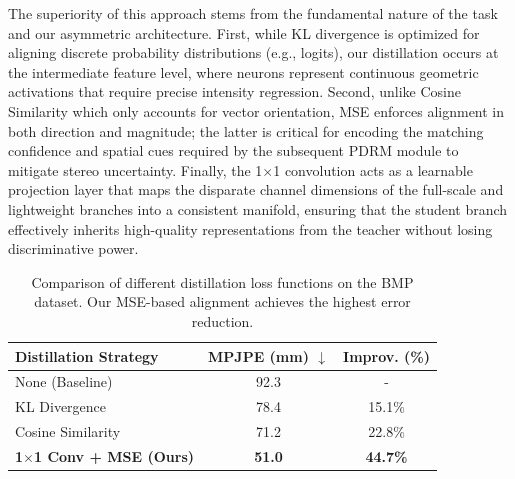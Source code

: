 \documentclass[journal]{IEEEtran}
\begin{document}
The superiority of this approach stems from the fundamental nature of the task and our asymmetric architecture. First, while KL divergence is optimized for aligning discrete probability distributions (e.g., logits), our distillation occurs at the intermediate feature level, where neurons represent continuous geometric activations that require precise intensity regression. Second, unlike Cosine Similarity which only accounts for vector orientation, MSE enforces alignment in both direction and magnitude; the latter is critical for encoding the matching confidence and spatial cues required by the subsequent PDRM module to mitigate stereo uncertainty. Finally, the 1$\times$1 convolution acts as a learnable projection layer that maps the disparate channel dimensions of the full-scale and lightweight branches into a consistent manifold, ensuring that the student branch effectively inherits high-quality representations from the teacher without losing discriminative power.

\begin{table}[htbp]
\centering
\caption{Comparison of different distillation loss functions on the BMP dataset. Our MSE-based alignment achieves the highest error reduction.}
\label{distillation_loss}
\renewcommand{\arraystretch}{1.1}
\small
\begin{tabular}{l|c|c}
\hline
\textbf{Distillation Strategy} & \textbf{MPJPE (mm) $\downarrow$} & \textbf{Improv. (\%)} \\ \hline
None (Baseline)                & 92.3                             & -                         \\
KL Divergence                  & 78.4                             & 15.1\%                    \\
Cosine Similarity              & 71.2                             & 22.8\%                    \\
\textbf{1$\times$1 Conv + MSE (Ours)} & \textbf{51.0}             & \textbf{44.7\%}           \\ \hline
\end{tabular}
\end{table}
\end{document}
